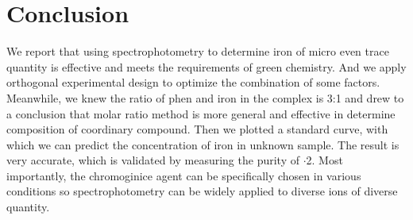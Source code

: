 \section{Conclusion}
We report that using spectrophotometry to determine iron of micro even trace quantity is effective and meets the requirements of green chemistry. And we apply orthogonal experimental design to optimize the combination of some factors. Meanwhile, we knew the ratio of phen and iron in the complex is 3:1 and drew to a conclusion that molar ratio method is more general and effective in determine composition of coordinary compound. Then we plotted a standard curve, with which we can predict the concentration of iron in unknown sample. The result is very accurate, which is validated by measuring the purity of $\cdot$2. Most importantly, the chromoginice agent can be specifically chosen in various conditions so spectrophotometry can be widely applied to diverse ions of diverse quantity.